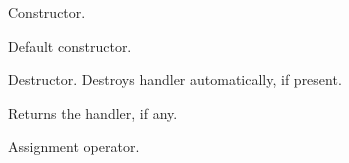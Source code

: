Constructor.



Default constructor.


\label{cbdiminfodtor}


Destructor. Destroys handler automatically, if present.


\label{cbdiminfogetdimhandler}


Returns the handler, if any.


\label{cbdiminfooperatorassign}


Assignment operator.

